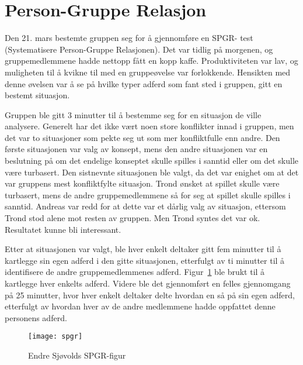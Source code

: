 \section{Person-Gruppe Relasjon} %
\label{sec:SPGR}
Den 21. mars bestemte gruppen seg for å gjennomføre en SPGR- test (Systematisere Person-Gruppe Relasjonen). Det var tidlig på morgenen, og gruppemedlemmene hadde nettopp fått en kopp kaffe. Produktiviteten var lav, og muligheten til å kvikne til med en gruppeøvelse var forlokkende. Hensikten med denne øvelsen var å se på hvilke typer adferd som fant sted i gruppen, gitt en bestemt situasjon. 

Gruppen ble gitt 3 minutter til å bestemme seg for en situasjon de ville analysere. Generelt har det ikke vært noen store konflikter innad i gruppen, men det var to situasjoner som pekte seg ut som mer konfliktfulle enn andre. Den første situasjonen var valg av konsept, mens den andre situasjonen var en beslutning på om det endelige konseptet skulle spilles i sanntid eller om det skulle være turbasert. Den sistnevnte situasjonen ble valgt, da det var enighet om at det var gruppens mest konfliktfylte situasjon. Trond ønsket at spillet skulle være turbasert, mens de andre gruppemedlemmene så for seg at spillet skulle spilles i sanntid. Andreas var redd for at dette var et dårlig valg av situasjon, ettersom Trond stod alene mot resten av gruppen. Men Trond syntes det var ok. Resultatet kunne bli interessant.

Etter at situasjonen var valgt, ble hver enkelt deltaker gitt fem
minutter til å kartlegge sin egen adferd i den gitte situasjonen,
etterfulgt av ti minutter til å identifisere de andre gruppemedlemmenes
adferd. Figur~\ref{fig:spgr} ble brukt til å kartlegge hver enkelts
adferd. Videre ble det gjennomført en felles gjennomgang på 25 minutter,
hvor hver enkelt deltaker delte hvordan en så på sin egen adferd,
etterfulgt av hvordan hver av de andre medlemmene hadde oppfattet denne
personens adferd.

\begin{figure} [H]
		\begin{center}
			\texttt{[image: spgr]}
		\end{center}
	\caption{Endre Sjøvolds SPGR-figur}
	\label{fig:spgr}
\end{figure}


